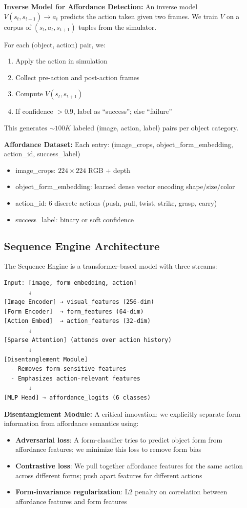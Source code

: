 \documentclass[11pt]{article}
\begin{document}
\textbf{Inverse Model for Affordance Detection:}
An inverse model $V(s_t, s_{t+1}) \to a_t$ predicts the action taken given two frames. We train $V$ on a corpus of $(s_t, a_t, s_{t+1})$ tuples from the simulator.

For each (object, action) pair, we:
\begin{enumerate}
    \item Apply the action in simulation
    \item Collect pre-action and post-action frames
    \item Compute $V(s_t, s_{t+1})$
    \item If confidence $> 0.9$, label as ``success''; else ``failure''
\end{enumerate}

This generates $\sim 100K$ labeled (image, action, label) pairs per object category.

\textbf{Affordance Dataset:}
Each entry: (image\_crops, object\_form\_embedding, action\_id, success\_label)
\begin{itemize}
    \item image\_crops: $224 \times 224$ RGB + depth
    \item object\_form\_embedding: learned dense vector encoding shape/size/color
    \item action\_id: 6 discrete actions (push, pull, twist, strike, grasp, carry)
    \item success\_label: binary or soft confidence
\end{itemize}

\subsection{Sequence Engine Architecture}

The Sequence Engine is a transformer-based model with three streams:

\begin{verbatim}
Input: [image, form_embedding, action]
       ↓
[Image Encoder] → visual_features (256-dim)
[Form Encoder]  → form_features (64-dim)
[Action Embed]  → action_features (32-dim)
       ↓
[Sparse Attention] (attends over action history)
       ↓
[Disentanglement Module]
  - Removes form-sensitive features
  - Emphasizes action-relevant features
       ↓
[MLP Head] → affordance_logits (6 classes)
\end{verbatim}

\textbf{Disentanglement Module:}
A critical innovation: we explicitly separate form information from affordance semantics using:
\begin{itemize}
    \item \textbf{Adversarial loss}: A form-classifier tries to predict object form from affordance features; we minimize this loss to remove form bias
    \item \textbf{Contrastive loss}: We pull together affordance features for the same action across different forms; push apart features for different actions
    \item \textbf{Form-invariance regularization}: L2 penalty on correlation between affordance features and form features
\end{itemize}
\end{document}
